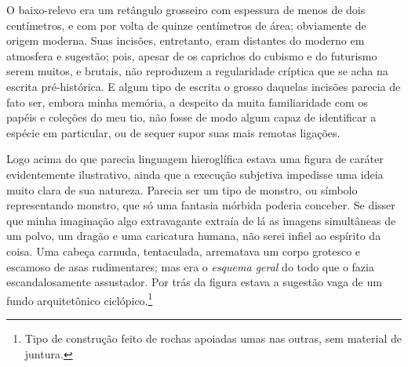 O baixo-relevo era um retângulo grosseiro com espessura de menos de dois
centímetros, e com por volta de quinze centímetros de área; obviamente de
origem moderna. Suas incisões, entretanto, eram distantes do moderno em
atmosfera e sugestão; pois, apesar de os caprichos do cubismo e do
futurismo serem muitos, e brutais, não reproduzem a regularidade
críptica que se acha na escrita pré-histórica. E algum tipo de escrita o
grosso daquelas incisões parecia de fato ser, embora minha memória, a
despeito da muita familiaridade com os papéis e coleções do meu tio, não
fosse de modo algum capaz de identificar a espécie em particular, ou
de sequer supor suas mais remotas ligações.

Logo acima do que parecia linguagem hieroglífica estava uma figura de
caráter evidentemente ilustrativo, ainda que a execução subjetiva
impedisse uma ideia muito clara de sua natureza. Parecia ser
um tipo de monstro, ou símbolo representando monstro, que só
uma fantasia mórbida poderia conceber. Se disser que minha imaginação
algo extravagante extraía de lá as imagens simultâneas de um polvo, um
dragão e uma caricatura humana, não serei infiel ao espírito da coisa.
Uma cabeça carnuda, tentaculada, arrematava um corpo grotesco e escamoso
de asas rudimentares; mas era o \emph{esquema geral} do todo que o fazia
escandalosamente assustador. Por trás da figura estava a sugestão vaga
de um fundo arquitetônico ciclópico.\footnote{Tipo de construção feito de
  rochas apoiadas umas nas outras, sem material de juntura.}

